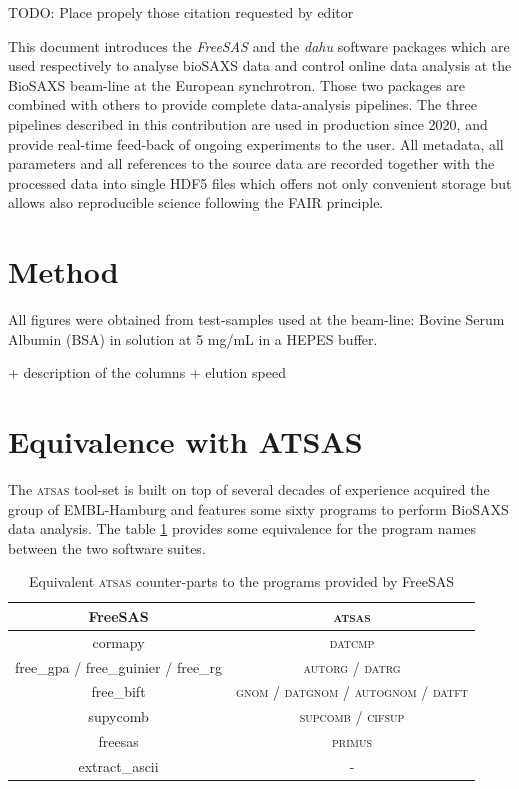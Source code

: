 \documentclass[preprint]{iucr}              %
\begin{document}
TODO: Place propely those citation requested by editor \cite{shibom} \cite{dawn} \cite{als-biosaxs}

This document introduces the \textit{FreeSAS} and the \textit{dahu} software packages which are used respectively to analyse bioSAXS data 
and control online data analysis at the BioSAXS beam-line at the European synchrotron. 
Those two packages are combined with others to provide complete data-analysis pipelines.
The three pipelines described in this contribution are used in production since 2020, and provide real-time feed-back of ongoing experiments to the user.
All metadata, all parameters and all references to the source data are recorded together with the processed data into single HDF5 files which offers 
not only convenient storage but allows also reproducible science following the FAIR principle. 

\appendix
\section{Method}

All figures were obtained from test-samples used at the beam-line: Bovine Serum Albumin (BSA) in solution at 5 mg/mL in a HEPES buffer.

+ description of the columns + elution speed

\section{Equivalence with ATSAS}
The \textsc{atsas} tool-set is built on top of several decades of experience acquired the group of EMBL-Hamburg and features some sixty programs to perform BioSAXS data analysis. The table \ref{freesas-atsas} provides some equivalence for the program names between the two software suites.
\begin{table}
    \begin{tabular}{|c|c|}
        \hline
        FreeSAS & \textsc{atsas} \\
        \hline
        cormapy & \textsc{datcmp}\\
        free\_gpa / free\_guinier / free\_rg& \textsc{autorg} / \textsc{datrg}\\
        free\_bift& \textsc{gnom} / \textsc{datgnom} / \textsc{autognom} / \textsc{datft}\\
        supycomb& \textsc{supcomb} / \textsc{cifsup} \\
        freesas& \textsc{primus}\\
        extract\_ascii& - \\
        \hline
    \end{tabular}
    \\
    \caption{Equivalent \textsc{atsas} counter-parts to the programs provided by FreeSAS }
    \label{freesas-atsas}
\end{table}
\end{document}
